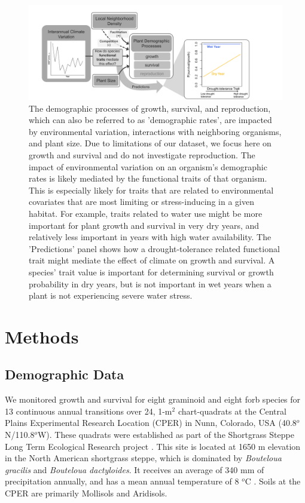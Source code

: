 \documentclass[12pt, letterpaper]{article}
\begin{document}
\begin{figure}
\includegraphics[width=1\textwidth]{images/CO_sgs_ConceptualFigure.pdf}
\caption{\small{
The demographic processes of growth, survival, and reproduction, which can also be referred to as 'demographic rates', are impacted by environmental variation, interactions with neighboring organisms, and plant size. Due to limitations of our dataset, we focus here on growth and survival and do not investigate reproduction. The impact of environmental variation on an organism's demographic rates is likely mediated by the functional traits of that organism. This is especially likely for traits that are related to environmental covariates that are most limiting or stress-inducing in a given habitat. For example, traits related to water use might be more important for plant growth and survival in very dry years, and relatively less important in years with high water availability. The 'Predictions' panel shows how a drought-tolerance related functional trait might mediate the effect of climate on growth and survival. A species' trait value is important for determining survival or growth probability in dry years, but is not important in wet years when a plant is not experiencing severe water stress. 
}}
\label{fig:ConceptFig}
\end{figure}

\section{Methods}
\subsection{Demographic Data} 
We monitored growth and survival for eight graminoid and eight forb species for 13 continuous annual transitions over 24, 1-m$^2$ chart-quadrats at the Central Plains Experimental Research Location (CPER) in Nunn, Colorado, USA (40.8$^o$N/110.8$^o$W). These quadrats were established as part of the Shortgrass Steppe Long Term Ecological Research project \citep{Chu2013}. This site is located at 1650 m elevation in the North American shortgrass steppe, which is dominated by \textit{Bouteloua gracilis} and \textit{Bouteloua dactyloides}. It receives an average of 340 mm of precipitation annually, and has a mean annual temperature of 8 $^o$C \citep{Chu2014}. Soils at the CPER are primarily Mollisols and Aridisols.
\end{document}
